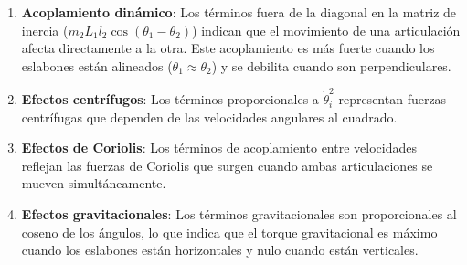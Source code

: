\begin{enumerate}
    \item \textbf{Acoplamiento dinámico}: Los términos fuera de la diagonal en la matriz de inercia ($m_2L_1l_2\cos(\theta_1 - \theta_2)$) indican que el movimiento de una articulación afecta directamente a la otra. Este acoplamiento es más fuerte cuando los eslabones están alineados ($\theta_1 \approx \theta_2$) y se debilita cuando son perpendiculares. 
    \item \textbf{Efectos centrífugos}: Los términos proporcionales a $\dot{\theta}_i^2$ representan fuerzas centrífugas que dependen de las velocidades angulares al cuadrado.
    \item \textbf{Efectos de Coriolis}: Los términos de acoplamiento entre velocidades reflejan las fuerzas de Coriolis que surgen cuando ambas articulaciones se mueven simultáneamente.
    \item \textbf{Efectos gravitacionales}: Los términos gravitacionales son proporcionales al coseno de los ángulos, lo que indica que el torque gravitacional es máximo cuando los eslabones están horizontales y nulo cuando están verticales.
\end{enumerate}

